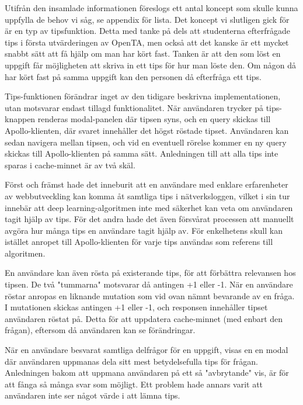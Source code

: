 Utifrån den insamlade informationen föreslogs ett antal koncept som skulle kunna uppfylla de behov vi såg, se appendix för lista. Det koncept vi slutligen gick för är en typ av tipsfunktion. Detta med tanke på dels att studenterna efterfrågade tips i första utvärderingen av OpenTA, men också att det kanske är ett mycket snabbt sätt att få hjälp om man har kört fast. Tanken är att den som löst en uppgift får möjligheten att skriva in ett tips för hur man löste den. Om någon då har kört fast på samma uppgift kan den personen då efterfråga ett tips.

Tips-funktionen förändrar inget av den tidigare beskrivna implementationen, utan motsvarar endast tillagd funktionalitet. När användaren trycker på tips-knappen renderas modal-panelen där tipsen syns, och en query skickas till Apollo-klienten, där svaret innehåller det högst röstade tipset. Användaren kan sedan navigera mellan tipsen, och vid en eventuell rörelse kommer en ny query skickas till Apollo-klienten på samma sätt. Anledningen till att alla tips inte sparas i cache-minnet är av två skäl. 

Först och främst hade det inneburit att en användare med enklare erfarenheter av webbutveckling kan komma åt samtliga tips i nätverksloggen, vilket i sin tur innebär att deep learning-algoritmen inte med säkerhet kan veta om användaren tagit hjälp av tips. För det andra hade det även försvårat processen att manuellt avgöra hur många tips en användare tagit hjälp av. För enkelhetens skull kan istället anropet till Apollo-klienten för varje tips användas som referens till algoritmen.

En användare kan även rösta på existerande tips, för att förbättra relevansen hos tipsen. De två "tummarna" motsvarar då antingen +1 eller -1. När en användare röstar anropas en liknande mutation som vid ovan nämnt bevarande av en fråga. I mutationen skickas antingen +1 eller -1, och responsen innehåller tipset användaren röstat på. Detta för att uppdatera cache-minnet (med enbart den frågan), eftersom då användaren kan se förändringar.

När en användare besvarat samtliga delfrågor för en uppgift, visas en en modal där användaren uppmanas dela sitt mest betydelsefulla tips för frågan. Anledningen bakom att uppmana användaren på ett så "avbrytande" vis, är för att fånga så många svar som möjligt. Ett problem hade annars varit att användaren inte ser något värde i att lämna tips.

